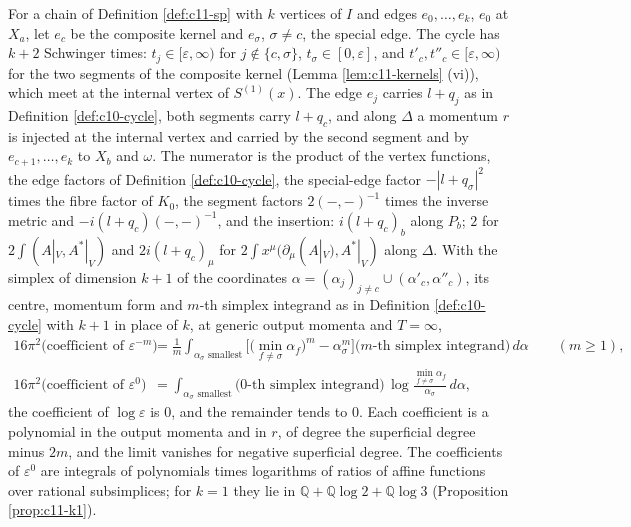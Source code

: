 \begin{theorem}
\label{thm:c11-simplex}
For a chain of Definition \ref{def:c11-sp} with $k$ vertices of $I$ and edges $e_0,\dots,e_k$, $e_0$ at $X_a$, let $e_c$ be the composite kernel and $e_\sigma$, $\sigma\ne c$, the special edge. The cycle has $k+2$ Schwinger times: $t_j\in[\varepsilon,\infty)$ for $j\notin\{c,\sigma\}$, $t_\sigma\in[0,\varepsilon]$, and $t'_c,t''_c\in[\varepsilon,\infty)$ for the two segments of the composite kernel (Lemma \ref{lem:c11-kernels} (vi)), which meet at the internal vertex of $S^{(1)}(x)$. The edge $e_j$ carries $l+q_j$ as in Definition \ref{def:c10-cycle}, both segments carry $l+q_c$, and along $\Delta$ a momentum $r$ is injected at the internal vertex and carried by the second segment and by $e_{c+1},\dots,e_k$ to $X_b$ and $\omega$. The numerator is the product of the vertex functions, the edge factors of Definition \ref{def:c10-cycle}, the special-edge factor $-|l+q_\sigma|^2$ times the fibre factor of $K_0$, the segment factors $2(-,-)^{-1}$ times the inverse metric and $-i(l+q_c)(-,-)^{-1}$, and the insertion: $i(l+q_c)_b$ along $P_b$; $2$ for $2\int(A|_V,A^*|_V)$ and $2i(l+q_c)_\mu$ for $2\int x^\mu(\partial_\mu(A|_V),A^*|_V)$ along $\Delta$. With the simplex of dimension $k+1$ of the coordinates $\alpha=(\alpha_j)_{j\ne c}\cup(\alpha'_c,\alpha''_c)$, its centre, momentum form and $m$-th simplex integrand as in Definition \ref{def:c10-cycle} with $k+1$ in place of $k$, at generic output momenta and $T=\infty$,
\begin{equation}
\begin{aligned}
16\pi^2\big(\text{coefficient of }\varepsilon^{-m}\big)&=\frac1m\int_{\alpha_\sigma\text{ smallest}}\Big[\big(\min_{f\ne\sigma}\alpha_f\big)^m-\alpha_\sigma^m\Big]\big(m\text{-th simplex integrand}\big)\,d\alpha\qquad(m\ge1),\\
16\pi^2\big(\text{coefficient of }\varepsilon^0\big)&=\int_{\alpha_\sigma\text{ smallest}}\big(0\text{-th simplex integrand}\big)\,\log\frac{\min_{f\ne\sigma}\alpha_f}{\alpha_\sigma}\,d\alpha,
\end{aligned}
\label{eq:c11-simplex}
\end{equation}
the coefficient of $\log\varepsilon$ is $0$, and the remainder tends to $0$. Each coefficient is a polynomial in the output momenta and in $r$, of degree the superficial degree minus $2m$, and the limit vanishes for negative superficial degree. The coefficients of $\varepsilon^0$ are integrals of polynomials times logarithms of ratios of affine functions over rational subsimplices; for $k=1$ they lie in $\mathbb Q+\mathbb Q\log2+\mathbb Q\log3$ (Proposition \ref{prop:c11-k1}).
\end{theorem}

